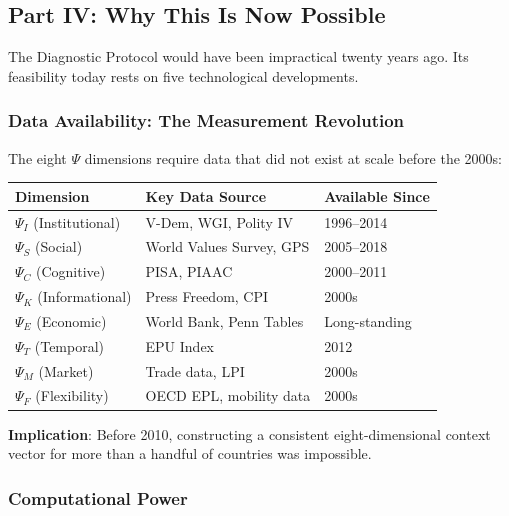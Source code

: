 \subsection{Part IV: Why This Is Now Possible}

The Diagnostic Protocol would have been impractical twenty years ago. Its 
feasibility today rests on five technological developments.

\subsubsection{Data Availability: The Measurement Revolution}

The eight $\Psi$ dimensions require data that did not exist at scale before 
the 2000s:

\begin{center}
\renewcommand{\arraystretch}{1.3}
\small
\begin{tabular}{|l|l|l|}
\hline
\textbf{Dimension} & \textbf{Key Data Source} & \textbf{Available Since} \\
\hline
$\Psi_I$ (Institutional) & V-Dem, WGI, Polity IV & 1996--2014 \\
$\Psi_S$ (Social) & World Values Survey, GPS & 2005--2018 \\
$\Psi_C$ (Cognitive) & PISA, PIAAC & 2000--2011 \\
$\Psi_K$ (Informational) & Press Freedom, CPI & 2000s \\
$\Psi_E$ (Economic) & World Bank, Penn Tables & Long-standing \\
$\Psi_T$ (Temporal) & EPU Index & 2012 \\
$\Psi_M$ (Market) & Trade data, LPI & 2000s \\
$\Psi_F$ (Flexibility) & OECD EPL, mobility data & 2000s \\
\hline
\end{tabular}
\end{center}

\textbf{Implication}: Before 2010, constructing a consistent eight-dimensional 
context vector for more than a handful of countries was impossible.

\subsubsection{Computational Power}

